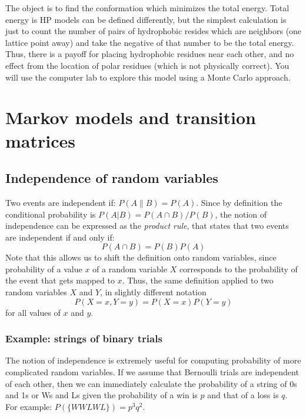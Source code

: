 \documentclass[
  letterpaper,
  DIV=11,
  numbers=noendperiod]{scrreprt}
\begin{document}
The object is to find the conformation which minimizes the total energy.
Total energy is HP models can be defined differently, but the simplest
calculation is just to count the number of pairs of hydrophobic resides
which are neighbors (one lattice point away) and take the negative of
that number to be the total energy. Thus, there is a payoff for placing
hydrophobic residues near each other, and no effect from the location of
polar residues (which is not physically correct). You will use the
computer lab to explore this model using a Monte Carlo approach.


\chapter{Markov models and transition
matrices}\label{markov-models-and-transition-matrices}

\section{Independence of random
variables}\label{independence-of-random-variables}

Two events are independent if: \(P(A\|B) = P(A)\). Since by definition
the conditional probability is \(P(A|B) = P(A\cap B)/P(B)\), the notion
of independence can be expressed as the \emph{product rule}, that states
that two events are independent if and only if:\[ 
P(A \cap B) = P(B)P(A)
\] Note that this allows us to shift the definition onto random
variables, since probability of a value \(x\) of a random variable \(X\)
corresponds to the probability of the event that gets mapped to \(x\).
Thus, the same definition applied to two random variables \(X\) and
\(Y\), in slightly different notation \[ 
P(X=x,Y=y) = P(X=x)P(Y=y)
\] for all values of \(x\) and \(y\).

\subsection{Example: strings of binary
trials}\label{example-strings-of-binary-trials}

The notion of independence is extremely useful for computing probability
of more complicated random variables. If we assume that Bernoulli trials
are independent of each other, then we can immediately calculate the
probability of a string of 0s and 1s or Ws and Ls given the probability
of a win is \(p\) and that of a loss is \(q\). For example:
\(P(\{WWLWL\}) = p^3q^2\).
\end{document}
